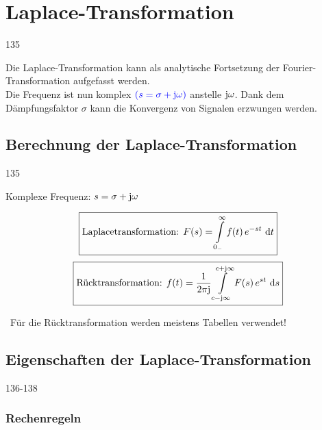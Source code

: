 \section{Laplace-Transformation}{135}

Die Laplace-Transformation kann als analytische Fortsetzung der Fourier-Transformation aufgefasst werden. \\
Die Frequenz ist nun komplex ${\color{blue}(s = \sigma + \mathrm{j} \omega)}$ anstelle $\mathrm{j} \omega$. Dank dem Dämpfungsfaktor $\sigma$ kann die
Konvergenz von Signalen erzwungen werden.


\subsection{Berechnung der Laplace-Transformation}{135}
\label{Berechnung der Laplace-Transformation}

Komplexe Frequenz: $s = \sigma + \mathrm{j} \omega $

$$ \boxed{\text{Laplacetransformation: } F(s) = \int\limits_{0_-}^{\infty} f(t) \, e^{-st} \, \mathop{} \! \mathrm{d} t  } $$
$$ \boxed{ \text{Rücktransformation: } f(t) = \frac{1}{2 \pi \mathrm{j}} \int\limits_{c - \mathrm{j} \infty}^{c+ \mathrm{j} \infty} F(s) \, e^{st} \, \mathop{} \! \mathrm{d} s  } $$

\textrightarrow\ Für die Rücktransformation werden meistens Tabellen verwendet!


\subsection{Eigenschaften der Laplace-Transformation}{136-138}

\subsubsection{Rechenregeln}

